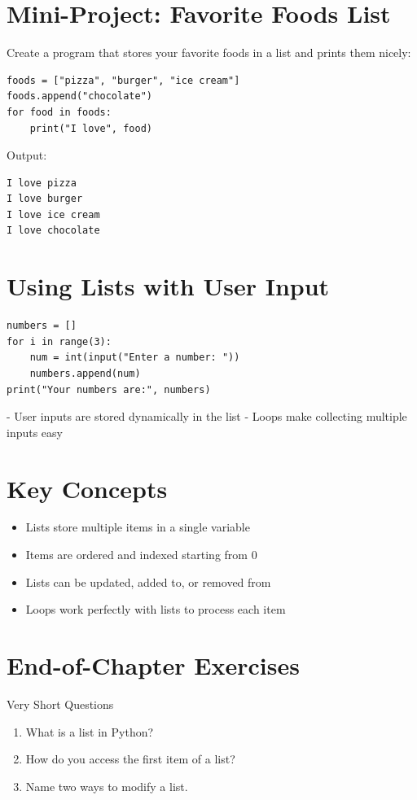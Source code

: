 \section{Mini-Project: Favorite Foods List}

Create a program that stores your favorite foods in a list and prints them nicely:

\begin{verbatim}
foods = ["pizza", "burger", "ice cream"]
foods.append("chocolate")
for food in foods:
    print("I love", food)
\end{verbatim}

Output:

\begin{verbatim}
I love pizza
I love burger
I love ice cream
I love chocolate
\end{verbatim}

\section{Using Lists with User Input}

\begin{verbatim}
numbers = []
for i in range(3):
    num = int(input("Enter a number: "))
    numbers.append(num)
print("Your numbers are:", numbers)
\end{verbatim}

- User inputs are stored dynamically in the list  
- Loops make collecting multiple inputs easy

\section{Key Concepts}

\begin{itemize}
    \item Lists store multiple items in a single variable  
    \item Items are ordered and indexed starting from 0  
    \item Lists can be updated, added to, or removed from  
    \item Loops work perfectly with lists to process each item  
\end{itemize}

\section{End-of-Chapter Exercises}

\begin{exercise}{Very Short Questions}
\begin{enumerate}
    \item What is a list in Python?  
    \item How do you access the first item of a list?  
    \item Name two ways to modify a list.  
\end{enumerate}
\end{exercise}

